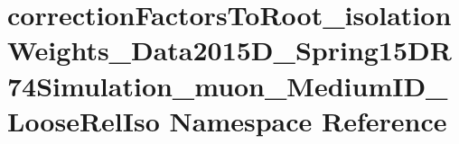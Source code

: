 \hypertarget{namespacecorrectionFactorsToRoot__isolationWeights__Data2015D__Spring15DR74Simulation__muon__MediumID__LooseRelIso}{
\section{correctionFactorsToRoot\_\-isolationWeights\_\-Data2015D\_\-Spring15DR74Simulation\_\-muon\_\-MediumID\_\-LooseRelIso Namespace Reference}
\label{namespacecorrectionFactorsToRoot__isolationWeights__Data2015D__Spring15DR74Simulation__muon__MediumID__LooseRelIso}
}
